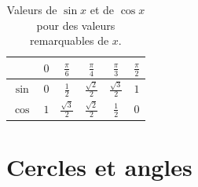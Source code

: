                   \begin{table}[h!]
                  \centering
                        \begin{tabular}{|c|c|c|c|c|c|}
                        \hline 
                               \raisebox{-8pt}{$\rule{0pt}{22pt}$}
                               & $\displaystyle{0}$                  & $\displaystyle{\frac{\pi}{6}}$      
                               & $\displaystyle{\frac{\pi}{4}}$      & $\displaystyle{\frac{\pi}{3}}$      
                               & $\displaystyle{\frac{\pi}{2}}$      \\ 
                        \hline 
                        $\displaystyle{\sin}$ \raisebox{-9pt}{$\rule{0pt}{27pt}$}
                               & $\displaystyle{0}$                  & $\displaystyle{\frac{1}{2}}$        
                               & $\displaystyle{\frac{\sqrt{2}}{2}}$ & $\displaystyle{\frac{\sqrt{3}}{2}}$ 
                               & $\displaystyle{1}$                  \\
                        \hline 
                        $\displaystyle{\cos}$ \raisebox{-9pt}{$\rule{0pt}{27pt}$}
                               & $\displaystyle{1}$                  & $\displaystyle{\frac{\sqrt{3}}{2}}$ 
                               & $\displaystyle{\frac{\sqrt{2}}{2}}$ & $\displaystyle{\frac{1}{2}}$        
                               & $\displaystyle{0}$                  \\ 
                        \hline 
                        \end{tabular} 
                  \caption{Valeurs de $\sin x$ et de $\cos x$ pour des valeurs remarquables de $x$.}
                  \end{table}

      

















\providecommand{\Cercle}{(\mathscr{C})}
\providecommand{\DroiteU}{(\mathscr{D}_1)}
\providecommand{\DroiteD}{(\mathscr{D}_2)}
	\section{Cercles et angles}
